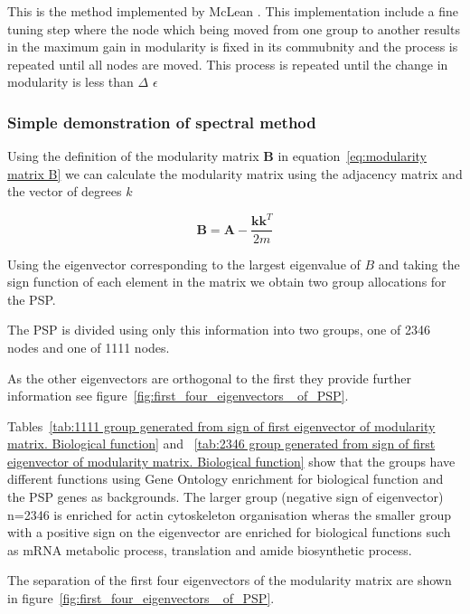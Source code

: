 This is the method implemented by McLean \cite{mclean2016improved}. This implementation include a fine tuning step where the node which being moved from one group to another results in the maximum gain in modularity is fixed in its commubnity and the process is repeated until all nodes are moved. This process is repeated until the change in modularity is less than $\Delta$ $\epsilon$

\subsubsection{Simple demonstration of spectral method}

Using the definition of the modularity matrix $\mathbf{B}$ in equation~\ref{eq:modularity matrix B} we can calculate the modularity matrix using the adjacency matrix and the vector of degrees $k$

\begin{equation}
    \mathbf{B} = \mathbf{A} - \frac{\mathbf{k} \mathbf{k}^T}{2m}
\end{equation}

Using the eigenvector corresponding to the largest eigenvalue of $B$ and taking the sign function of each element in the matrix we obtain two group allocations for the PSP. 

The PSP is divided using only this information into two groups, one of 2346 nodes and one of 1111 nodes. 

As the other eigenvectors are orthogonal to the first they provide further information see figure~\ref{fig:first_four_eigenvectors _of_PSP}.

Tables~\ref{tab:1111 group generated from sign of first eigenvector of modularity matrix. Biological function} and ~\ref{tab:2346 group generated from sign of first eigenvector of modularity matrix. Biological function} show that the groups have different functions using Gene Ontology enrichment for biological function and the PSP genes as backgrounds. The larger group (negative sign of eigenvector) n=2346 is enriched for actin cytoskeleton organisation wheras the smaller group with a positive sign on the eigenvector are enriched for biological functions such as mRNA metabolic process, translation and amide biosynthetic process. 

The separation of the first four eigenvectors of the modularity matrix are shown in figure~\ref{fig:first_four_eigenvectors _of_PSP}. 

